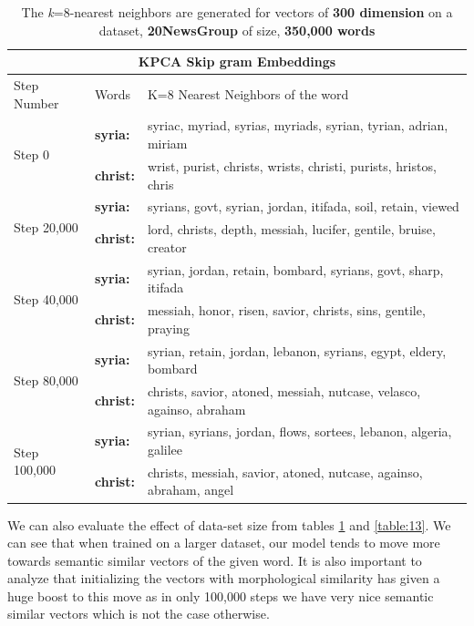 \begin{table}
	\centering
	\begin{tabular}{|l|l|l|}
	\hline
	\multicolumn{3}{|c|}{KPCA Skip gram Embeddings} \\
	\hline
	Step Number & Words & K=8 Nearest Neighbors of the word \\ \hline
	\multirow{2}{*}{Step 0} & \textbf{syria:} & syriac, myriad, syrias, myriads, syrian, tyrian, adrian, miriam \\
	& \textbf{christ:} & wrist, purist, christs, wrists, christi, purists, hristos, chris \\ 
	\hline
	\multirow{2}{*}{Step 20,000} & \textbf{syria:} & syrians, govt, syrian, jordan, itifada, soil, retain, viewed \\
	& \textbf{christ:} & lord, christs, depth, messiah, lucifer, gentile, bruise, creator \\
	\hline
	\multirow{2}{*}{Step 40,000} & \textbf{syria:} & syrian, jordan, retain, bombard, syrians, govt, sharp, itifada \\
	& \textbf{christ:} & messiah, honor, risen, savior, christs, sins, gentile, praying \\
	\hline
	\multirow{2}{*}{Step 80,000} & \textbf{syria:} & syrian, retain, jordan, lebanon, syrians, egypt, eldery, bombard \\
	& \textbf{christ:} & christs, savior, atoned, messiah, nutcase, velasco, againso, abraham \\
	\hline
	\multirow{2}{*}{Step 100,000} & \textbf{syria:} &  syrian, syrians, jordan, flows, sortees, lebanon, algeria, galilee\\
	& \textbf{christ:} & christs, messiah, savior, atoned, nutcase, againso, abraham, angel \\
	\hline
\end{tabular}
\caption{The \textit{k}=8-nearest neighbors are generated for vectors of \textbf{300 dimension} on a dataset, \textbf{20NewsGroup} of size, \textbf{350,000 words}}\label{table:12}
\end{table}
We can also evaluate the effect of data-set size from tables \ref{table:12} and \ref{table:13}. We can see that when trained on a larger dataset, our model tends to move more towards semantic similar vectors of the given word. It is also important to analyze that initializing the vectors with morphological similarity has given a huge boost to this move as in only 100,000 steps we have very nice semantic similar vectors which is not the case otherwise.
